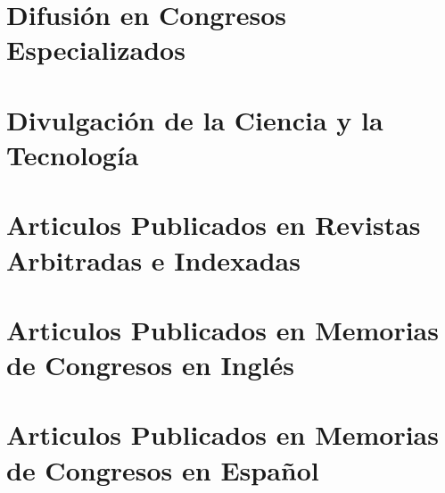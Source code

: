\documentclass[letterpaper,10pt]{article}
\newcounter{num}
\begin{document}
\section{Difusión en Congresos Especializados}
\begin{refsection}[DifusionEnEventos]
\nocite{*}
\printbibliography[heading={none}, keyword=DEPA, resetnumbers=true]
\end{refsection}



\section{Divulgación de la Ciencia y la Tecnología}
\begin{refsection}[DivulgacionCienciaTecnologia]
\nocite{*}
\printbibliography[heading={none}, keyword=DCyT, resetnumbers=true]
\end{refsection}


\section{Articulos Publicados en Revistas Arbitradas e Indexadas}
\begin{refsection}[Revistas]
\nocite{*}
\printbibliography[heading={none}, keyword=three, resetnumbers=true]
\end{refsection}





\section{Articulos Publicados en Memorias de Congresos en Inglés}
\begin{refsection}[CongresosArb]
\nocite{*}
\printbibliography[heading={none}, keyword=four, resetnumbers=true]
\end{refsection}



\section{Articulos Publicados en Memorias de Congresos en Español}
\begin{refsection}[CongresosEspanol]
\nocite{*}
\printbibliography[heading={none}, keyword=five, resetnumbers=true]
\end{refsection}
\end{document}
